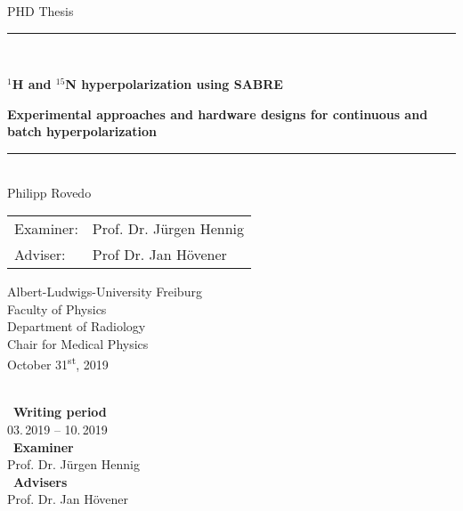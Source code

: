 
\begin{titlepage}
\begin{center}

\newcommand{\HorizontalLine}{\rule{\linewidth}{0.3mm}}

{\Large PHD Thesis}\\[1.3cm]


\HorizontalLine \\[0.4cm]
\begin{spacing}{3}
    {\huge \bfseries $^1$H and $^{15}$N hyperpolarization using SABRE} \\
\end{spacing}
\begin{spacing}{2}
    {\Large \bfseries Experimental approaches and hardware designs for continuous and batch hyperpolarization}\\
\end{spacing}
\HorizontalLine \\[1.5cm]


	{\Huge Philipp Rovedo} \\[2cm]


\begin{tabular}[hc]{>{\huge}l >{\huge}l}
  Examiner: & Prof. Dr. J\"urgen Hennig \\[0.3cm]
  Adviser: & Prof Dr. Jan H\"ovener \\[1.2cm]
\end{tabular}
\vfill  %

\Large {
    Albert-Ludwigs-University Freiburg\\
    Faculty of Physics\\
    Department of Radiology\\
    Chair for Medical Physics\\[1cm]

    October 31\textsuperscript{st}, 2019\\
}
\end{center}
\end{titlepage}

\ \vfill \ \\  %
\
\textbf{Writing period}            \smallskip{} \\
03.\,2019 -- 10.\,2019   \bigskip{} \\
\
\textbf{Examiner}                  \smallskip{} \\
Prof. Dr. J\"urgen Hennig               \bigskip{} \\
\
\textbf{Advisers}                  \smallskip{} \\
Prof. Dr. Jan H\"ovener

